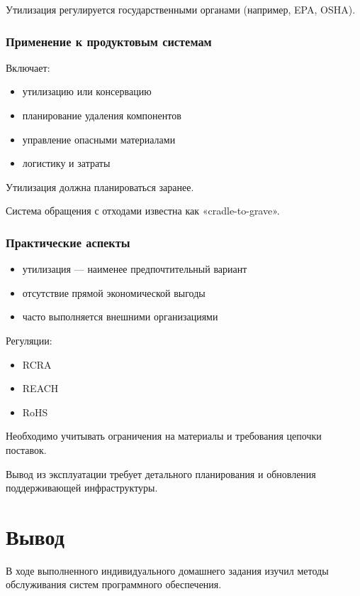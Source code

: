 \documentclass[14pt,a4paper]{extarticle}
\begin{document}
Утилизация регулируется государственными органами (например, EPA, OSHA).

\subsubsection{Применение к продуктовым системам}

Включает:

\begin{itemize}
\item утилизацию или консервацию
\item планирование удаления компонентов
\item управление опасными материалами
\item логистику и затраты
\end{itemize}

Утилизация должна планироваться заранее.

Система обращения с отходами известна как «cradle-to-grave».

\subsubsection{Практические аспекты}

\begin{itemize}
\item утилизация — наименее предпочтительный вариант
\item отсутствие прямой экономической выгоды
\item часто выполняется внешними организациями
\end{itemize}

Регуляции:

\begin{itemize}
\item RCRA
\item REACH
\item RoHS
\end{itemize}

Необходимо учитывать ограничения на материалы и требования цепочки поставок.

Вывод из эксплуатации требует детального планирования и обновления поддерживающей инфраструктуры.


\section{Вывод}
В ходе выполненного индивидуального домашнего задания изучил методы обслуживания систем программного обеспечения.
\end{document}
